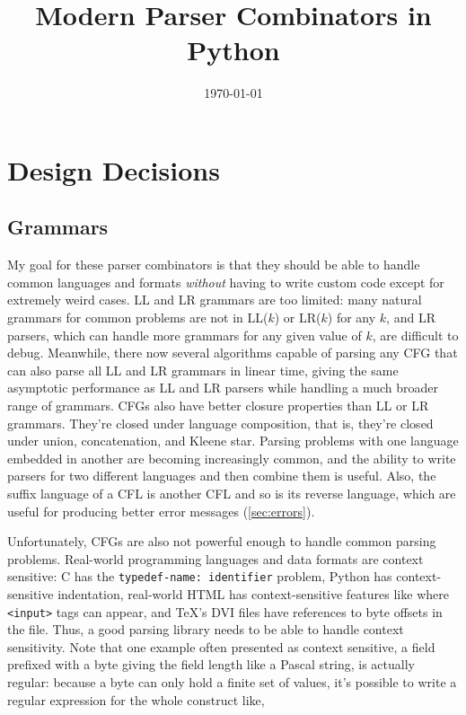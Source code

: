 \documentclass[12pt]{article}
\title{Modern Parser Combinators in Python}
\date{\today}
\begin{document}
\maketitle

\section{Design Decisions}
\label{sec:design_decisions}

\subsection{Grammars}
\label{sec:grammar}

My goal for these parser combinators is that they should be able to
handle common languages and formats \emph{without} having to write
custom code except for extremely weird cases.  LL and LR grammars are
too limited: many natural grammars for common problems are not in
LL($k$) or LR($k$) for any $k$, and LR parsers, which can handle more
grammars for any given value of $k$, are difficult to debug.
Meanwhile, there now several algorithms capable of parsing any CFG
that can also parse all LL and LR grammars in linear time, giving the
same asymptotic performance as LL and LR parsers while handling a much
broader range of grammars.  CFGs also have better closure properties
than LL or LR grammars.  They're closed under language composition,
that is, they're closed under union, concatenation, and Kleene star.
Parsing problems with one language embedded in another are becoming
increasingly common, and the ability to write parsers for two
different languages and then combine them is useful.  Also, the suffix
language of a CFL is another CFL \parencite[p. 401]{grune_jacobs} and
so is its reverse language, which are useful for producing better
error messages (\ref{sec:errors}).

Unfortunately, CFGs are also not powerful enough to handle common
parsing problems.  Real-world programming languages and data formats
are context sensitive: C has the \texttt{typedef-name: identifier}
problem, Python has context-sensitive indentation, real-world HTML has
context-sensitive features like where \texttt{<input>} tags can
appear, and \TeX's DVI files have references to byte offsets in the
file.  Thus, a good parsing library needs to be able to handle context
sensitivity.  Note that one example often presented as context
sensitive, a field prefixed with a byte giving the field length like a
Pascal string, is actually regular: because a byte can only hold a
finite set of values, it's possible to write a regular expression for
the whole construct like,
\end{document}
